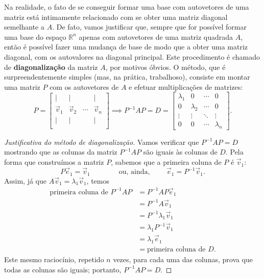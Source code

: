 Na realidade, o fato de se conseguir formar uma base com autovetores de uma matriz está intimamente relacionado com se obter uma matriz diagonal semelhante a $A$. De fato, vamos justificar que, sempre que for possível formar uma base do espaço $\mathbb{R}^n$ apenas com autovetores de uma matriz quadrada $A$, então é possível fazer uma mudança de base de modo que a obter uma matriz diagonal, com os autovalores na diagonal principal. Este procedimento é chamado de \textbf{diagonalização} da matriz $A$, por motivos óbvios. O método, que é surpreendentemente simples (mas, na prática, trabalhoso), consiste em montar uma matriz $P$ com os autovetores de $A$ e efetuar multiplicações de matrizes:
\begin{equation}
P = \begin{bmatrix}
| & | &  & | \\
\vec{v}_1 & \vec{v}_2 & \cdots & \vec{v}_n \\
| & | &  & |\\
\end{bmatrix} \implies P^{-1} A P = D = \begin{bmatrix}
\lambda_1 & 0  & \cdots & 0 \\
0 & \lambda_2  & \cdots & 0 \\
\vdots & \vdots & \ddots & \vdots \\
0 & 0 & \cdots & \lambda_n
\end{bmatrix}.
\end{equation}

\begin{proof}[Justificativa do método de diagonalização]
Vamos verificar que $P^{-1} A P = D$ mostrando que as colunas da matriz $P^{-1} A P$ são iguais às colunas de $D$. Pela forma que construímos a matriz $P$, sabemos que a primeira coluna de $P$ é $\vec{v}_1$:
\begin{equation}
P \vec{e}_1 = \vec{v}_1 \qquad \qquad \text{ou, ainda, } \qquad  \vec{e}_1 = P^{-1} \vec{v}_1.
\end{equation} Assim, já que $A \vec{v}_1 = \lambda_1 \vec{v}_1$, temos
\begin{equation}
\begin{split}
\text{primeira coluna de } P^{-1} A P  & = P^{-1} A P \vec{e}_1 \\
                                       & = P^{-1} A \vec{v}_1 \\
                                       & = P^{-1} \lambda_1 \vec{v}_1 \\
                                       & = \lambda_1 P^{-1} \vec{v}_1 \\
                                       & = \lambda_1 \vec{e}_1 \\
                                       & = \text{primeira coluna de } D.
\end{split}
\end{equation}
Este mesmo raciocínio, repetido $n$ vezes, para cada uma das colunas, prova que todas as colunas são iguais; portanto, $P^{-1} A P = D$.
\end{proof}

